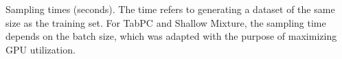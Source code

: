 \begin{table}[!ht]  
    \centering
    \caption{Sampling times (seconds). The time refers to generating a dataset of the same size as the training set. For TabPC and Shallow Mixture, the sampling time depends on the batch size, which was adapted with the purpose of maximizing GPU utilization.} 
    \label{tbl:sampling_time}
    \begin{threeparttable}
    {
    \resizebox{\columnwidth}{!}
    {


  }
  }
	\end{threeparttable}
\end{table}